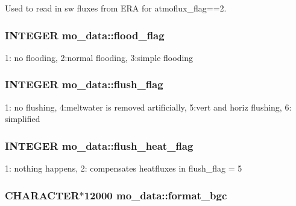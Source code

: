 Used to read in sw fluxes from ERA for atmoflux\_\-flag==2. 

\hypertarget{namespacemo__data_a7e6cb2f19ab88a5903aa5574e5ec6b19}{
\subsubsection[{flood\_\-flag}]{\setlength{\rightskip}{0pt plus 5cm}INTEGER {\bf mo\_\-data::flood\_\-flag}}}
\label{namespacemo__data_a7e6cb2f19ab88a5903aa5574e5ec6b19}


1: no flooding, 2:normal flooding, 3:simple flooding 

\hypertarget{namespacemo__data_aa062c97301f949aea320e57c72926700}{
\subsubsection[{flush\_\-flag}]{\setlength{\rightskip}{0pt plus 5cm}INTEGER {\bf mo\_\-data::flush\_\-flag}}}
\label{namespacemo__data_aa062c97301f949aea320e57c72926700}


1: no flushing, 4:meltwater is removed artificially, 5:vert and horiz flushing, 6: simplified 

\hypertarget{namespacemo__data_a2f88c08cc3cae9d46a6bdcd9232ddbfa}{
\subsubsection[{flush\_\-heat\_\-flag}]{\setlength{\rightskip}{0pt plus 5cm}INTEGER {\bf mo\_\-data::flush\_\-heat\_\-flag}}}
\label{namespacemo__data_a2f88c08cc3cae9d46a6bdcd9232ddbfa}


1: nothing happens, 2: compensates heatfluxes in flush\_\-flag = 5 

\hypertarget{namespacemo__data_ac2bdb68249acc513c69fb2793f6f376c}{
\subsubsection[{format\_\-bgc}]{\setlength{\rightskip}{0pt plus 5cm}CHARACTER$\ast$12000 {\bf mo\_\-data::format\_\-bgc}}}
\label{namespacemo__data_ac2bdb68249acc513c69fb2793f6f376c}


